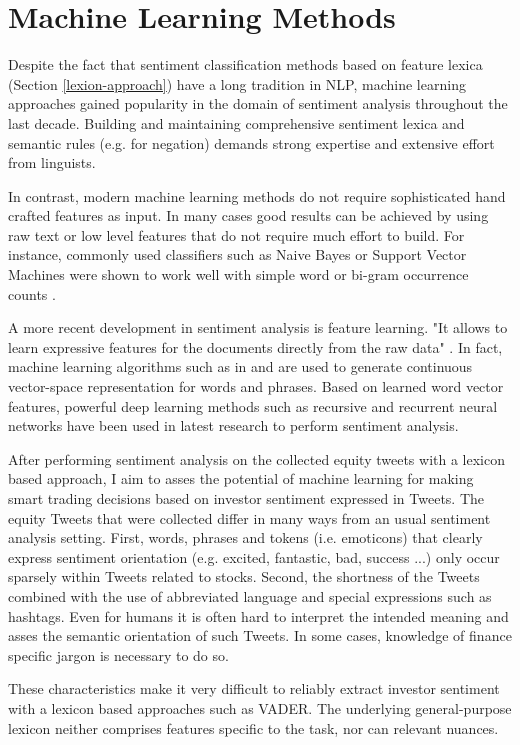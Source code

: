 \documentclass[a4paper,12pt]{article}%
\begin{document}
\section{Machine Learning Methods}
Despite the fact that sentiment classification methods based on feature lexica (Section \ref{lexion-approach}) have a long tradition in NLP, machine learning approaches gained popularity in the domain of sentiment analysis throughout the last decade. Building and maintaining comprehensive sentiment lexica and semantic rules (e.g. for negation) demands strong expertise and extensive effort from linguists.

In contrast, modern machine learning methods do not require sophisticated hand crafted features as input. In many cases good results can be achieved by using raw text or low level features that do not require much effort to build. For instance, commonly used classifiers such as Naive Bayes or Support Vector Machines were shown to work well with simple word or bi-gram occurrence counts \citep{Pang2002}. 

A more recent development in sentiment analysis is feature learning. "It allows to learn expressive features for the documents directly from the raw data" \citep{Albertini2014}. In fact, machine learning algorithms such as in \citet{Socher2011a} and \citet{Maas2011} are used to generate continuous vector-space representation for words and phrases. Based on learned word vector features, powerful deep learning methods such as recursive and recurrent neural networks have been used in latest research to perform sentiment analysis.

After performing sentiment analysis on the collected equity tweets with a lexicon based approach, I aim to asses the potential of machine learning for making smart trading decisions based on investor sentiment expressed in Tweets. The equity Tweets that were collected differ in many ways from an usual sentiment analysis setting. First, words, phrases and tokens (i.e. emoticons) that clearly express sentiment orientation (e.g. excited, fantastic, bad, success ...) only occur sparsely within Tweets related to stocks. Second, the shortness of the Tweets combined with the use of abbreviated language and special expressions such as hashtags. Even for humans it is often hard to interpret the intended meaning and asses the semantic orientation of such Tweets. In some cases, knowledge of finance specific jargon is necessary to do so.

These characteristics make it very difficult to reliably extract investor sentiment with a lexicon based approaches such as VADER. The underlying general-purpose lexicon neither comprises features specific to the task, nor can relevant nuances.
\end{document}
